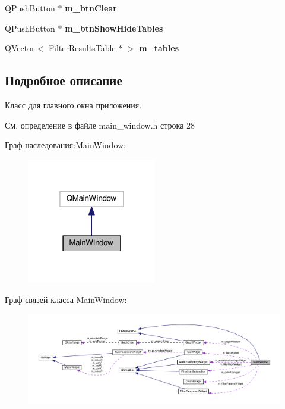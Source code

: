 \begin{DoxyCompactItemize}
\item 
Q\+Push\+Button $\ast$ {\bfseries m\+\_\+btn\+Clear}\hypertarget{class_main_window_a00b995ad2a53bd276a53fc137048b278}{}\label{class_main_window_a00b995ad2a53bd276a53fc137048b278}

\item 
Q\+Push\+Button $\ast$ {\bfseries m\+\_\+btn\+Show\+Hide\+Tables}\hypertarget{class_main_window_a3fd0f094bf729b91405b14deb7ae4c54}{}\label{class_main_window_a3fd0f094bf729b91405b14deb7ae4c54}

\item 
Q\+Vector$<$ \hyperlink{class_filter_results_table}{Filter\+Results\+Table} $\ast$ $>$ {\bfseries m\+\_\+tables}\hypertarget{class_main_window_aab37e47932ec4fc5002724bdef5f959b}{}\label{class_main_window_aab37e47932ec4fc5002724bdef5f959b}

\end{DoxyCompactItemize}


\subsection{Подробное описание}
Класс для главного окна приложения. 

См. определение в файле main\+\_\+window.\+h строка 28



Граф наследования\+:Main\+Window\+:
\nopagebreak
\begin{figure}[H]
\begin{center}
\leavevmode
\includegraphics[width=160pt]{class_main_window__inherit__graph}
\end{center}
\end{figure}


Граф связей класса Main\+Window\+:
\nopagebreak
\begin{figure}[H]
\begin{center}
\leavevmode
\includegraphics[width=350pt]{class_main_window__coll__graph}
\end{center}
\end{figure}


